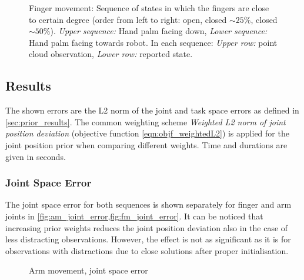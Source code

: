 \begin{figure}
\begin{tabular}{c:c:c}
\end{tabular}
\caption[Finger movement sequence]{Finger movement: Sequence of states in which the fingers are close to certain degree (order from left to right: open, closed $\sim 25\%$, closed $\sim 50\%$). \textit{Upper sequence:} Hand palm facing down, \textit{Lower sequence:} Hand palm facing towards robot. In each sequence: \textit{Upper row:} point cloud observation, \textit{Lower row:} reported state.}
\label{fig:finger_movement_states}
\end{figure}


\subsection{Results}

The shown errors are the L2 norm of the joint and task space errors as defined in \cref{sec:prior_results}. The common weighting scheme \emph{Weighted L2 norm of joint position deviation} (objective function \cref{eqn:objf_weightedL2}) is applied for the joint position prior when comparing different weights. Time and durations are given in seconds.

\subsubsection{Joint Space Error}

The joint space error for both sequences is shown separately for finger and arm joints in \cref{fig:am_joint_error,fig:fm_joint_error}. It can be noticed that increasing prior weights reduces the joint position deviation also in the case of less distracting observations. However, the effect is not as significant as it is for observations with distractions due to close solutions after proper initialisation.

\begin{figure}[h]
\centering
{}
\caption{Arm movement, joint space error}
\label{fig:am_joint_error}
\end{figure}


